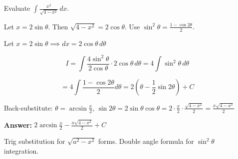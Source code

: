\begin{problem}
Evaluate $\int \frac{x^2}{\sqrt{4-x^2}} \, dx$.
\end{problem}

\begin{hint}
Let $x = 2\sin\theta$. Then $\sqrt{4-x^2} = 2\cos\theta$. Use $\sin^2\theta = \frac{1-\cos 2\theta}{2}$.
\end{hint}

\begin{solution}
Let $x = 2\sin\theta \implies dx = 2\cos\theta \, d\theta$

\[
I = \int \frac{4\sin^2\theta}{2\cos\theta} \cdot 2\cos\theta \, d\theta = 4\int \sin^2\theta \, d\theta
\]

\[
= 4\int \frac{1-\cos 2\theta}{2} d\theta = 2\left(\theta - \frac{1}{2}\sin 2\theta\right) + C
\]

Back-substitute: $\theta = \arcsin\frac{x}{2}$, $\sin 2\theta = 2\sin\theta\cos\theta = 2 \cdot \frac{x}{2} \cdot \frac{\sqrt{4-x^2}}{2} = \frac{x\sqrt{4-x^2}}{2}$

\textbf{Answer:} $\boxed{2\arcsin\frac{x}{2} - \frac{x\sqrt{4-x^2}}{2} + C}$
\end{solution}

\begin{takeaways}
Trig substitution for $\sqrt{a^2-x^2}$ forms. Double angle formula for $\sin^2\theta$ integration.
\end{takeaways}

